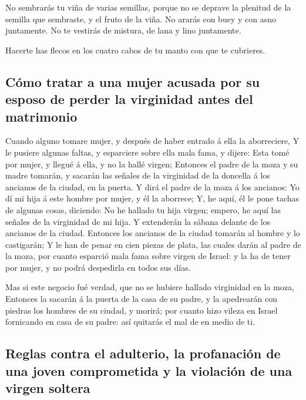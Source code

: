  No sembrarás tu viña de varias semillas, porque no se
deprave la plenitud de la semilla que sembraste, y el fruto de la viña.
 No ararás con buey y con asno juntamente.
 No te vestirás de mistura, de lana y lino juntamente.

 Hacerte has flecos en los cuatro cabos de tu manto con
que te cubrieres.

\hypertarget{cuxf3mo-tratar-a-una-mujer-acusada-por-su-esposo-de-perder-la-virginidad-antes-del-matrimonio}{%
\subsection{Cómo tratar a una mujer acusada por su esposo de perder la
virginidad antes del
matrimonio}\label{cuxf3mo-tratar-a-una-mujer-acusada-por-su-esposo-de-perder-la-virginidad-antes-del-matrimonio}}

 Cuando alguno tomare mujer, y después de haber entrado á
ella la aborreciere,  Y le pusiere algunas faltas, y
esparciere sobre ella mala fama, y dijere: Esta tomé por mujer, y llegué
á ella, y no la hallé virgen;  Entonces el padre de la
moza y su madre tomarán, y sacarán las señales de la virginidad de la
doncella á los ancianos de la ciudad, en la puerta.  Y
dirá el padre de la moza á los ancianos: Yo dí mi hija á este hombre por
mujer, y él la aborrece;  Y, he aquí, él le pone tachas
de algunas cosas, diciendo: No he hallado tu hija virgen; empero, he
aquí las señales de la virginidad de mi hija. Y extenderán la sábana
delante de los ancianos de la ciudad.  Entonces los
ancianos de la ciudad tomarán al hombre y lo castigarán; 
Y le han de penar en cien piezas de plata, las cuales darán al padre de
la moza, por cuanto esparció mala fama sobre virgen de Israel: y la ha
de tener por mujer, y no podrá despedirla en todos sus días.

 Mas si este negocio fué verdad, que no se hubiere
hallado virginidad en la moza,  Entonces la sacarán á la
puerta de la casa de su padre, y la apedrearán con piedras los hombres
de su ciudad, y morirá; por cuanto hizo vileza en Israel fornicando en
casa de su padre: así quitarás el mal de en medio de ti.

\hypertarget{reglas-contra-el-adulterio-la-profanaciuxf3n-de-una-joven-comprometida-y-la-violaciuxf3n-de-una-virgen-soltera}{%
\subsection{Reglas contra el adulterio, la profanación de una joven
comprometida y la violación de una virgen
soltera}\label{reglas-contra-el-adulterio-la-profanaciuxf3n-de-una-joven-comprometida-y-la-violaciuxf3n-de-una-virgen-soltera}}

